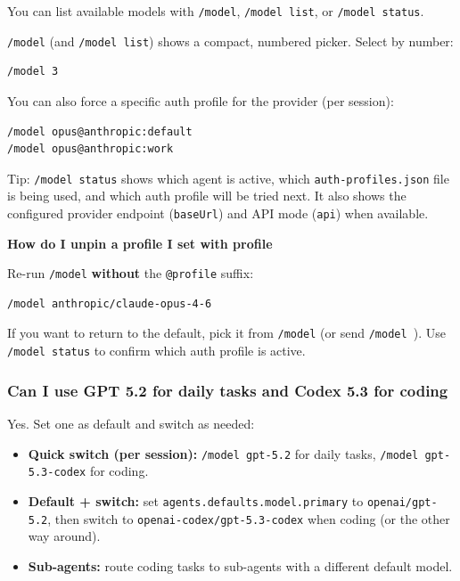You can list available models with \texttt{/model}, \texttt{/model list}, or \texttt{/model status}.

\texttt{/model} (and \texttt{/model list}) shows a compact, numbered picker. Select by number:

\begin{lstlisting}
/model 3
\end{lstlisting}


You can also force a specific auth profile for the provider (per session):

\begin{lstlisting}
/model opus@anthropic:default
/model opus@anthropic:work
\end{lstlisting}


Tip: \texttt{/model status} shows which agent is active, which \texttt{auth-profiles.json} file is being used, and which auth profile will be tried next.
It also shows the configured provider endpoint (\texttt{baseUrl}) and API mode (\texttt{api}) when available.

\textbf{How do I unpin a profile I set with profile}

Re-run \texttt{/model} \textbf{without} the \texttt{@profile} suffix:

\begin{lstlisting}
/model anthropic/claude-opus-4-6
\end{lstlisting}


If you want to return to the default, pick it from \texttt{/model} (or send \texttt{/model }).
Use \texttt{/model status} to confirm which auth profile is active.

\subsubsection{Can I use GPT 5.2 for daily tasks and Codex 5.3 for coding}


Yes. Set one as default and switch as needed:

\begin{itemize}
  \item \textbf{Quick switch (per session):} \texttt{/model gpt-5.2} for daily tasks, \texttt{/model gpt-5.3-codex} for coding.
  \item \textbf{Default + switch:} set \texttt{agents.defaults.model.primary} to \texttt{openai/gpt-5.2}, then switch to \texttt{openai-codex/gpt-5.3-codex} when coding (or the other way around).
  \item \textbf{Sub-agents:} route coding tasks to sub-agents with a different default model.
\end{itemize}


